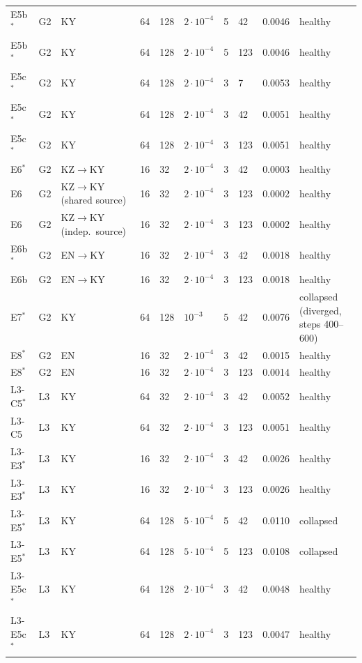 \documentclass[11pt]{article}
\begin{document}
\begin{table}[!htbp]
\begin{tabular}{llllllllrl}
E5b$^\ast$ & G2 & KY & 64 & 128 & $2{\cdot}10^{-4}$ & 5 & 42 & 0.0046 & healthy \\
E5b$^\ast$ & G2 & KY & 64 & 128 & $2{\cdot}10^{-4}$ & 5 & 123 & 0.0046 & healthy \\
E5c$^\ast$ & G2 & KY & 64 & 128 & $2{\cdot}10^{-4}$ & 3 & 7 & 0.0053 & healthy \\
E5c$^\ast$ & G2 & KY & 64 & 128 & $2{\cdot}10^{-4}$ & 3 & 42 & 0.0051 & healthy \\
E5c$^\ast$ & G2 & KY & 64 & 128 & $2{\cdot}10^{-4}$ & 3 & 123 & 0.0051 & healthy \\
E6$^\ast$ & G2 & KZ$\to$KY & 16 & 32 & $2{\cdot}10^{-4}$ & 3 & 42 & 0.0003 & healthy \\
E6 & G2 & KZ$\to$KY (shared source) & 16 & 32 & $2{\cdot}10^{-4}$ & 3 & 123 & 0.0002 & healthy \\
E6 & G2 & KZ$\to$KY (indep.\ source) & 16 & 32 & $2{\cdot}10^{-4}$ & 3 & 123 & 0.0002 & healthy \\
E6b$^\ast$ & G2 & EN$\to$KY & 16 & 32 & $2{\cdot}10^{-4}$ & 3 & 42 & 0.0018 & healthy \\
E6b & G2 & EN$\to$KY & 16 & 32 & $2{\cdot}10^{-4}$ & 3 & 123 & 0.0018 & healthy \\
E7$^\ast$ & G2 & KY & 64 & 128 & $10^{-3}$ & 5 & 42 & 0.0076 & collapsed (diverged, steps 400--600) \\
E8$^\ast$ & G2 & EN & 16 & 32 & $2{\cdot}10^{-4}$ & 3 & 42 & 0.0015 & healthy \\
E8$^\ast$ & G2 & EN & 16 & 32 & $2{\cdot}10^{-4}$ & 3 & 123 & 0.0014 & healthy \\
L3-C5$^\ast$ & L3 & KY & 64 & 32 & $2{\cdot}10^{-4}$ & 3 & 42 & 0.0052 & healthy \\
L3-C5 & L3 & KY & 64 & 32 & $2{\cdot}10^{-4}$ & 3 & 123 & 0.0051 & healthy \\
L3-E3$^\ast$ & L3 & KY & 16 & 32 & $2{\cdot}10^{-4}$ & 3 & 42 & 0.0026 & healthy \\
L3-E3$^\ast$ & L3 & KY & 16 & 32 & $2{\cdot}10^{-4}$ & 3 & 123 & 0.0026 & healthy \\
L3-E5$^\ast$ & L3 & KY & 64 & 128 & $5{\cdot}10^{-4}$ & 5 & 42 & 0.0110 & collapsed \\
L3-E5$^\ast$ & L3 & KY & 64 & 128 & $5{\cdot}10^{-4}$ & 5 & 123 & 0.0108 & collapsed \\
L3-E5c$^\ast$ & L3 & KY & 64 & 128 & $2{\cdot}10^{-4}$ & 3 & 42 & 0.0048 & healthy \\
L3-E5c$^\ast$ & L3 & KY & 64 & 128 & $2{\cdot}10^{-4}$ & 3 & 123 & 0.0047 & healthy \\

\end{tabular}
\end{table}
\end{document}
